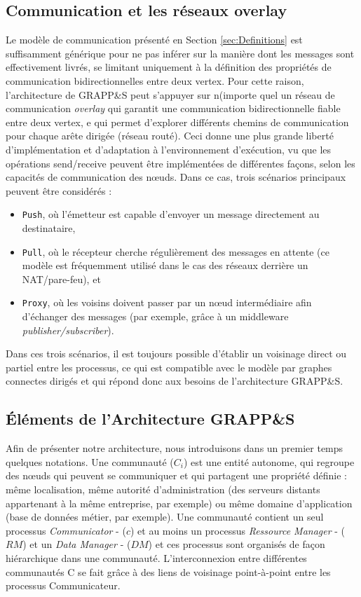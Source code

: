 \subsection{Communication et les réseaux overlay}
Le modèle de communication présenté en Section \ref{sec:Definitions} est suffisamment générique pour ne pas inférer sur la manière dont les messages sont effectivement livrés, se limitant uniquement à la définition des propriétés de communication bidirectionnelles entre deux vertex. Pour cette raison, l'architecture de GRAPP\&S peut s'appuyer sur n(importe quel un réseau de communication \textit{overlay} qui garantit une communication bidirectionnelle fiable entre deux vertex, e qui permet d'explorer différents chemins de communication pour chaque arête dirigée (réseau routé). Ceci donne une plus grande liberté d'implémentation et d'adaptation à l'environnement d'exécution, vu que les opérations send/receive peuvent être implémentées de différentes façons, selon les capacités de communication des n{\oe}uds. Dans ce cas, trois scénarios principaux peuvent être considérés : 
\begin{itemize}
	\item \texttt{Push}, où l'émetteur est capable d'envoyer un message directement au destinataire, 
	\item\texttt{Pull}, où le récepteur cherche régulièrement des messages en attente (ce modèle est fréquemment utilisé dans le cas des réseaux derrière un NAT/pare-feu), et 
	\item\texttt{Proxy}, où les voisins doivent passer par un n{\oe}ud intermédiaire afin d'échanger des messages (par exemple, grâce à un middleware \textit{publisher/subscriber}). 
\end{itemize}
Dans ces trois scénarios, il est toujours possible d'établir un voisinage direct ou partiel entre les processus, ce qui est compatible avec le modèle par graphes connectes dirigés et qui répond donc aux besoins de l'architecture GRAPP\&S. 


\subsection{Éléments de l'Architecture GRAPP\&S}

Afin de présenter notre architecture, nous introduisons dans un premier temps quelques notations. Une communauté ($C_i$) est une entité autonome, qui regroupe des n{\oe}uds qui peuvent se communiquer et qui partagent une propriété définie : même localisation, même autorité d'administration (des serveurs distants appartenant à la même entreprise, par exemple) ou même domaine d'application (base de données métier, par exemple). Une communauté contient un seul processus \textit{Communicator} - ($c$) et au moins un processus \textit{Ressource Manager} - ($RM$) et un \textit{Data Manager} - ($DM$) et ces processus sont organisés de façon hiérarchique dans une communauté. L'interconnexion entre différentes communautés C se fait grâce à des liens de voisinage point-à-point entre les processus Communicateur.

